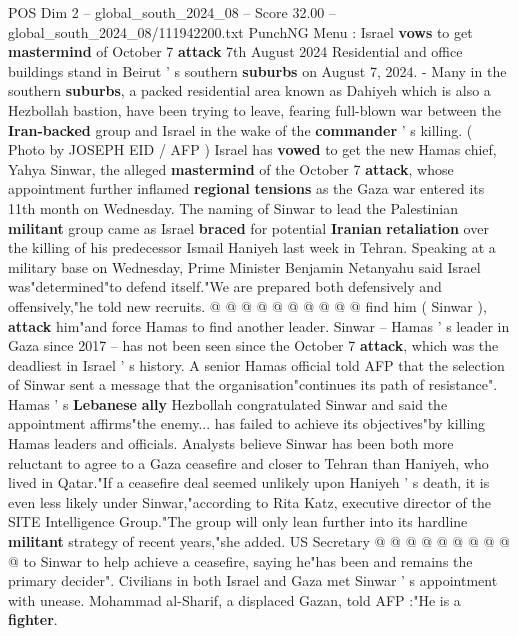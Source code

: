 \begin{textsample}{POS Dim 2 – global\_south\_2024\_08 – Score 32.00 – global\_south\_2024\_08/111942200.txt}  \label{ex:f2_pos_007}
PunchNG Menu : Israel \textbf{vows} to get \textbf{mastermind} of October 7 \textbf{attack} 7th August 2024 Residential and office buildings stand in Beirut ' s southern \textbf{suburbs} on August 7, 2024. - Many in the southern \textbf{suburbs}, a packed residential area known as Dahiyeh which is also a Hezbollah bastion, have been trying to leave, fearing full-blown war between the \textbf{Iran-backed} group and Israel in the wake of the \textbf{commander} ' s killing. ( Photo by JOSEPH EID / AFP ) Israel has \textbf{vowed} to get the new Hamas chief, Yahya Sinwar, the alleged \textbf{mastermind} of the October 7 \textbf{attack}, whose appointment further inflamed \textbf{regional} \textbf{tensions} as the Gaza war entered its 11th month on Wednesday.
The naming of Sinwar to lead the Palestinian \textbf{militant} group came as Israel \textbf{braced} for potential \textbf{Iranian} \textbf{retaliation} over the killing of his predecessor Ismail Haniyeh last week in Tehran.
Speaking at a military base on Wednesday, Prime Minister Benjamin Netanyahu said Israel was"determined"to defend itself."We are prepared both defensively and offensively,"he told new recruits. @ @ @ @ @ @ @ @ @ @ find him ( Sinwar ), \textbf{attack} him"and force Hamas to find another leader.
Sinwar -- Hamas ' s leader in Gaza since 2017 -- has not been seen since the October 7 \textbf{attack}, which was the deadliest in Israel ' s history.
A senior Hamas official told AFP that the selection of Sinwar sent a message that the organisation"continues its path of resistance".
Hamas ' s \textbf{Lebanese} \textbf{ally} Hezbollah congratulated Sinwar and said the appointment affirms"the enemy... has failed to achieve its objectives"by killing Hamas leaders and officials.
Analysts believe Sinwar has been both more reluctant to agree to a Gaza ceasefire and closer to Tehran than Haniyeh, who lived in Qatar."If a ceasefire deal seemed unlikely upon Haniyeh ' s death, it is even less likely under Sinwar,"according to Rita Katz, executive director of the SITE Intelligence Group."The group will only lean further into its hardline \textbf{militant} strategy of recent years,"she added.
US Secretary @ @ @ @ @ @ @ @ @ @ to Sinwar to help achieve a ceasefire, saying he"has been and remains the primary decider".
Civilians in both Israel and Gaza met Sinwar ' s appointment with unease.
Mohammad al-Sharif, a displaced Gazan, told AFP :"He is a \textbf{fighter}.

\end{textsample}
